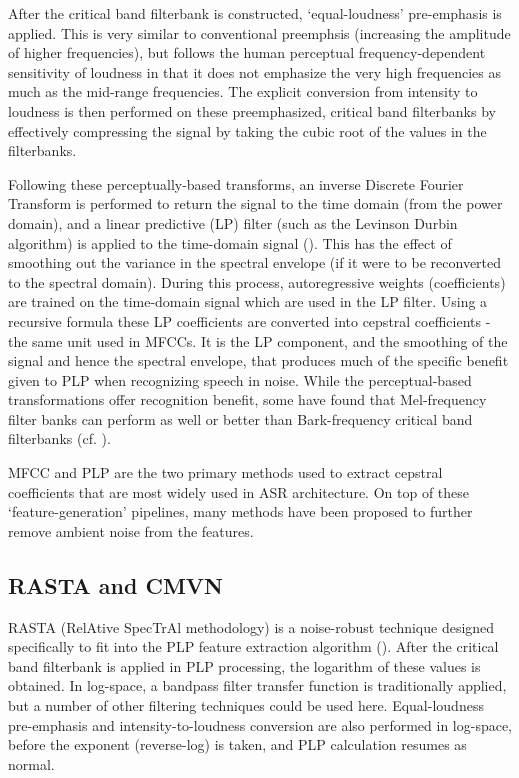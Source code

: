 After the critical band filterbank is constructed, `equal-loudness' pre-emphasis is applied.  This is very similar to conventional preemphsis (increasing the amplitude of higher frequencies), but follows the human perceptual frequency-dependent sensitivity of loudness in that it does not emphasize the very high frequencies as much as the mid-range frequencies.%
The explicit conversion from intensity to loudness is then performed on these preemphasized, critical band filterbanks by effectively compressing the signal by taking the cubic root of the values in the filterbanks.

Following these perceptually-based transforms, an inverse Discrete Fourier Transform is performed to return the signal to the time domain (from the power domain), and a linear predictive (LP) filter (such as the Levinson Durbin algorithm) is applied to the time-domain signal (\cite{gold:11}).  This has the effect of smoothing out the variance in the spectral envelope (if it were to be reconverted to the spectral domain).  During this process, autoregressive weights (coefficients) are trained on the time-domain signal which are used in the LP filter.  Using a recursive formula these LP coefficients are converted into cepstral coefficients - the same unit used in MFCCs.  It is the LP component, and the smoothing of the signal and hence the spectral envelope, that produces much of the specific benefit given to PLP when recognizing speech in noise.  While the perceptual-based transformations offer recognition benefit, some have found that Mel-frequency filter banks can perform as well or better than Bark-frequency critical band filterbanks (cf. \cite{honig:05}).

MFCC and PLP are the two primary methods used to extract cepstral coefficients that are most widely used in ASR architecture.  On top of these `feature-generation' pipelines, many methods have been proposed to further remove ambient noise from the features.

\subsection{RASTA and CMVN}\label{sec:rasta_cmvn}

RASTA (RelAtive SpecTrAl methodology) is a noise-robust technique designed specifically to fit into the PLP feature extraction algorithm (\cite{hermansky:92}).  After the critical band filterbank is applied in PLP processing, the logarithm of these values is obtained.  In log-space, a bandpass filter transfer function is traditionally applied, but a number of other filtering techniques could be used here.  Equal-loudness pre-emphasis and intensity-to-loudness conversion are also performed in log-space, before the exponent (reverse-log) is taken, and PLP calculation resumes as normal.

